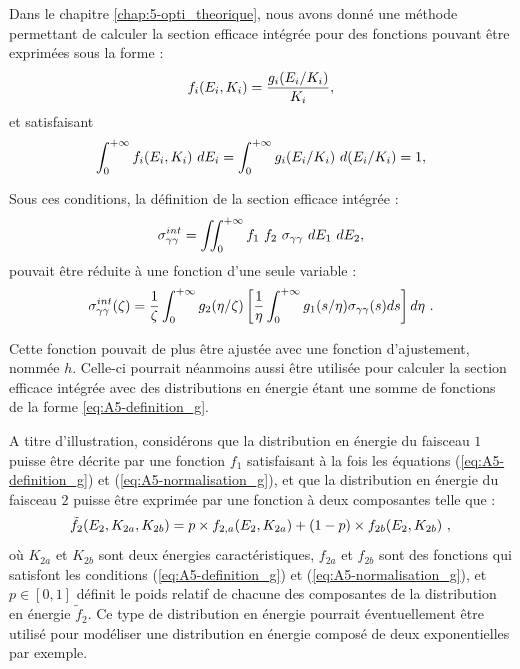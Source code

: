 Dans le chapitre \ref{chap:5-opti_theorique}, nous avons donné une méthode permettant de calculer la section efficace intégrée pour des fonctions pouvant être exprimées sous la forme :
\begin{equation}
    f_i(E_i, K_i) = \dfrac{g_i(E_i/K_i)}{K_i} \rm ,
    \label{eq:A5-definition_g}
\end{equation}
et satisfaisant
\begin{equation}
    \int_0^{+\infty} f_i (E_i, K_i) ~ dE_i = \int_0^{+\infty} g_i (E_i/K_i) ~ d(E_i/K_i) = 1 \rm ,
    \label{eq:A5-normalisation_g}
\end{equation}

Sous ces conditions, la définition de la section efficace intégrée :
\begin{equation}
    \sigma_{\gamma\gamma}^{int} = \iint_{0}^{+\infty} f_1 ~ f_2 ~ \sigma_{\gamma\gamma} ~ dE_1 ~ dE_2 \rm ,
    \label{eq:A5-sigma_int_definition}
\end{equation}
pouvait être réduite à une fonction d'une seule variable :
\begin{equation}
    \sigma_{\gamma\gamma}^{int}(\zeta) = \dfrac{1}{\zeta} \int_0^{+\infty} g_2(\eta/\zeta) \left[\dfrac{1}{\eta} \int_0^{+\infty} g_1(s/\eta) \sigma_{\gamma\gamma}(s) ds \right] d\eta ~ \rm .
    \label{eq:A5-sigma_int_1_variable}
\end{equation}

Cette fonction pouvait de plus être ajustée avec une fonction d'ajustement, nommée $h$. Celle-ci pourrait néanmoins aussi être utilisée pour calculer la section efficace intégrée avec des distributions en énergie étant une somme de fonctions de la forme \ref{eq:A5-definition_g}.

A titre d'illustration, considérons que la distribution en énergie du faisceau $1$ puisse être décrite par une fonction $f_1$ satisfaisant à la fois les équations (\ref{eq:A5-definition_g}) et (\ref{eq:A5-normalisation_g}), et que la distribution en énergie du faisceau $2$ puisse être exprimée par une fonction à deux composantes telle que :
\begin{equation}
    \tilde{f_2}(E_2, K_{2a}, K_{2b}) = p \times f_{2,a}(E_2,K_{2a}) + (1-p) \times f_{2b}(E_2,K_{2b}) ~ \rm ,
\end{equation}
où $K_{2a}$ et $K_{2b}$ sont deux énergies caractéristiques, $f_{2a}$ et $f_{2b}$ sont des fonctions qui satisfont les conditions (\ref{eq:A5-definition_g}) et (\ref{eq:A5-normalisation_g}), et $p \in[0,1]$ définit le poids relatif de chacune des composantes de la distribution en énergie $\tilde{f}_2$.
Ce type de distribution en énergie pourrait éventuellement être utilisé pour modéliser une distribution en énergie composé de deux exponentielles par exemple.


